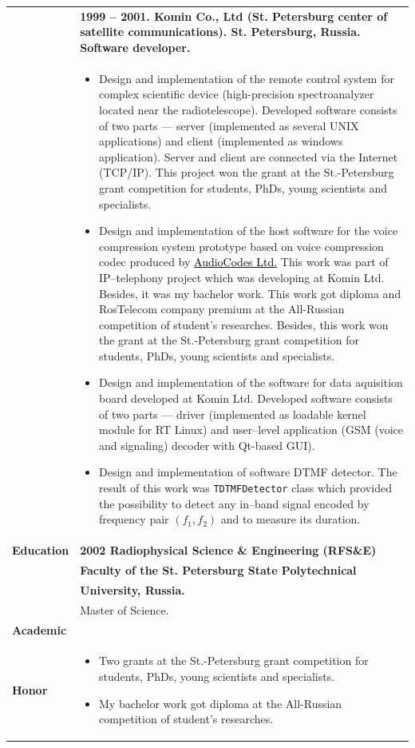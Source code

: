 \documentclass[a4paper]{article}
\newcommand{\myhref}[2]{\href{#1}{\textcolor{black}{#2}}}
\begin{document}
\newpage
\vspace*{-1cm}

\begin{tabular}{lp{12cm}}
& \bf 1999 -- 2001. Komin Co., Ltd (St. Petersburg center of satellite communications). St. Petersburg, Russia. Software developer.\\[-.5cm]
& \begin{itemize}
\item Design and implementation
of the remote control system for complex scientific device 
(high-precision spectroanalyzer located near the radiotelescope).
Developed software consists of two parts --- server (implemented as several
UNIX applications) and client (implemented as windows application).
Server and client are connected via the Internet (TCP/IP). 
This project won the grant at the St.-Petersburg grant
competition for students, PhDs, young scientists  and specialists.
\item Design and implementation of the host software for the  
voice compression system prototype based on voice compression codec produced by
\myhref{http://www.audiocodes.com}{AudioCodes Ltd.}
This work was part of IP--telephony project which was developing at 
Komin Ltd.  Besides, it was my bachelor work.  
This work got diploma and RosTelecom company premium at the All-Russian 
competition of student's researches.
Besides, this work won the grant at the St.-Petersburg grant competition
for students, PhDs, young scientists  and specialists.
\item Design and implementation of the software for data aquisition board
developed at Komin Ltd.
Developed software consists of two parts --- driver (implemented as loadable 
kernel module for RT Linux) and user--level application (GSM (voice and signaling) decoder with
Qt-based GUI).
\item Design and implementation of software DTMF 
detector.  The result of this work was \texttt{TDTMFDetector}
class which provided the possibility
to detect any in--band signal encoded by frequency pair $(f_1, f_2)$ and
to measure its duration.
\end{itemize}\\
\bf Education& \bf 2002  Radiophysical Science \& Engineering (RFS\&E)\\
& \bf Faculty of the  St. Petersburg State Polytechnical\\
& \bf University, Russia.\\
& Master of Science.\\
\bf Academic\\
\bf Honor & \vspace*{-1cm}\begin{itemize}
\item Two grants at the St.-Petersburg grant competition
for students, PhDs, young scientists  and specialists.
\item My bachelor work got diploma at the All-Russian competition of student's researches.
\end{itemize}
\end{tabular}
\end{document}
